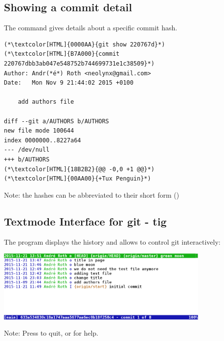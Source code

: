 \subsection{Showing a commit detail}
\begin{frame}[fragile]
  \subslidetitle
The  command gives details about a specific commit hash.

\begin{lstlisting}
(*\textcolor[HTML]{0000AA}{git show 220767d}*)
(*\textcolor[HTML]{B7A000}{commit 220767dbb3ab047e548752b744699731e1c38509}*)
Author: Andr(*é*) Roth <neolynx@gmail.com>
Date:   Mon Nov 9 21:44:02 2015 +0100

    add authors file

diff --git a/AUTHORS b/AUTHORS
new file mode 100644
index 0000000..8227a64
--- /dev/null
+++ b/AUTHORS
(*\textcolor[HTML]{18B2B2}{@@ -0,0 +1 @@}*)
(*\textcolor[HTML]{00AA00}{+Tux Penguin}*)
\end{lstlisting}

Note: the hashes can be abbreviated to their short form ()
\end{frame}

\subsection{Textmode Interface for git - tig}
\begin{frame}[fragile]
  \subslidetitle
  The program  displays the history and allows to control git interactively:
  \newline \vspace{1em}
  \centerline{\includegraphics[width=10.5cm]{../screen/tig_screenshot.png}}

  \vspace{1em}
  Note: Press  to quit, or  for help.
\end{frame}

